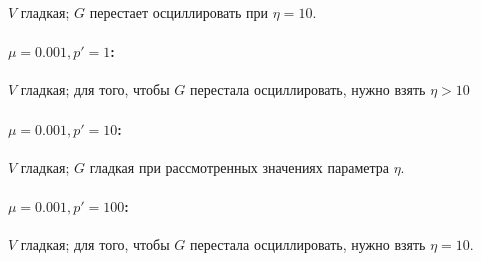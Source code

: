 \documentclass[12pt]{article}
\begin{document}
$V$ гладкая; $G$ перестает осциллировать при $\eta = 10$.
\paragraph{$\mu = 0.001, p' = 1$:}

$V$ гладкая; для того, чтобы $G$ перестала осциллировать, нужно взять $\eta > 10$
\paragraph{$\mu = 0.001, p' = 10$:}

$V$ гладкая; $G$ гладкая при рассмотренных значениях параметра $\eta$.
\paragraph{$\mu = 0.001, p' = 100$:}

$V$ гладкая; для того, чтобы $G$ перестала осциллировать, нужно взять $\eta = 10$.
\end{document}
